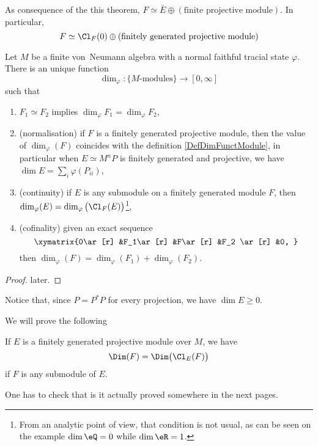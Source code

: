 As consequence of the this theorem, $F\simeq \bar E\oplus(\text{finite projective module})$. In particular,
\begin{equation}
	F\simeq \Cl_F(0)\oplus  (\text{finitely generated projective module})
\end{equation}

\begin{theorem}		\label{ThoPropDimiM}
Let $M$ be a finite von~Neumann algebra with a normal faithful tracial state $\varphi$. There is an unique function 
\[ 
	\dim_{\varphi}\colon \{ \text{$M$-modules} \}\to [0,\infty]
\]
such that
\begin{enumerate}
\item $F_1\simeq F_2$ implies $\dim_{\varphi}F_1=\dim_{\varphi}F_2$,
\item (normalisation) if $F$ is a finitely generated projective module, then the value of $\dim_{\varphi}(F)$ coincides with the definition \eqref{DefDimFunctModule}, in particular when $E\simeq M^nP$ is finitely generated and projective, we have $\dim E=\sum_i\varphi(P_{ii})$,
\item (continuity) if $E$ is any submodule on a finitely generated module $F$, then $\dim_{\varphi}(E)=\dim_{\varphi}\big( \Cl_F(E) \big)$\footnote{From an analytic point of view, that condition is not usual, as can be seen on the example $\dim\eQ=0$ while $\dim\eR=1$.},
\item\label{ItemCofinalitySuiteExact} (cofinality) given an exact sequence
\[ 
	\xymatrix{%
   0\ar[r] 	&F_1\ar[r]	&F\ar[r]	&F_2 \ar[r]	&0,
}
\]
then $\dim_{\varphi}(F)=\dim_{\varphi}(F_1)+\dim_{\varphi}(F_2)$.
\end{enumerate}
\end{theorem}

\begin{proof}
later.
\end{proof}

Notice that, since $P=P^*P$ for every projection, we have $\dim E\geq 0$.

We will prove the following
\begin{proposition}			\label{PropDimClEgalDim}
If $E$ is a finitely generated projective module over $M$, we have
\begin{equation}
	\Dim(F)=\Dim\big( \Cl_E(F) \big)
\end{equation}
if $F$ is any submodule of $E$.
\end{proposition}

\begin{probleme}
One has to check that is it actually proved somewhere in the next pages.
\end{probleme}

